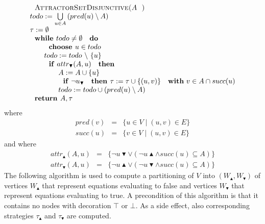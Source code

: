 \begin{equation*}
\begin{array}{l}
\text{\textsc{AttractorSetDisjunctive(}}A\text{\textsc{)}} \\ 
todo:=\bigcup\limits_{u\in A}\left( pred(u)\setminus A\right)  \\ 
\tau :=\emptyset  \\ 
\text{\textbf{while }}todo\neq \emptyset \text{ \textbf{do}} \\ 
\qquad \text{\textbf{choose }}u\in todo \\ 
\qquad todo:=todo\ \backslash \ \{u\} \\ 
\qquad \text{\textbf{if} }attr_{\blacktriangledown }(A,u)\text{ \textbf{then}%
} \\ 
\qquad \qquad A:=A\cup \{u\} \\ 
\qquad \qquad \text{\textbf{if} }\lnot u_{\blacktriangledown }\text{ \textbf{%
then }}\tau :=\tau \cup \{(u,v)\}\text{ \textbf{with} }v\in A\cap succ(u) \\ 
\qquad \qquad todo:=todo\cup \left( pred(u)\setminus A\right)  \\ 
\text{\textbf{return }}A,\tau 
\end{array}%
\end{equation*}%
where%
\begin{eqnarray*}
pred(v) &=&\{u\in V\mid (u,v)\in E\} \\
succ(u) &=&\{v\in V\mid (u,v)\in E\}
\end{eqnarray*}%
and where%
\begin{eqnarray*}
attr_{\blacktriangle }(A,u) &=&\{\lnot u\blacktriangledown \vee \left( \lnot
u\blacktriangle \wedge succ(u)\subseteq A\right) \} \\
attr_{\blacktriangledown }(A,u) &=&\{\lnot u\blacktriangle \vee \left( \lnot
u\blacktriangledown \wedge succ(u)\subseteq A\right) \}
\end{eqnarray*}%
The following algorithm is used to compute a partitioning of $V$ into $%
\left( W_{\blacktriangle },W_{\blacktriangledown }\right) $ of vertices $%
W_{\blacktriangle }$ that represent equations evaluating to false and
vertices $W_{\blacktriangledown }$ that represent equations evaluating to
true. A precondition of this algorithm is that it contains no nodes with
decoration $\top $ or $\bot $. As a side effect, also corresponding
strategies $\tau _{\blacktriangle }$ and $\tau _{\blacktriangledown }$ are
computed.%
